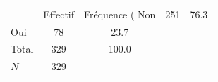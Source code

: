 {
\def\sym#1{\ifmmode^{#1}\else\(^{#1}\)\fi}
\begin{tabular}{l*{1}{cc}}
\toprule
            &    Effectif&Fréquence (%
\midrule
Non         &         251&        76.3\\
Oui         &          78&        23.7\\
Total       &         329&       100.0\\
\midrule
\(N\)       &         329&            \\
\bottomrule
\end{tabular}
}
